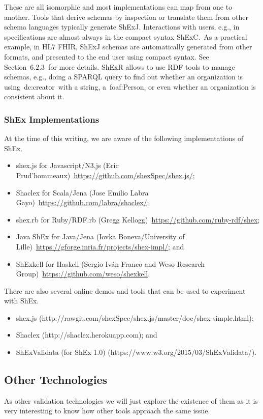 These are all isomorphic and most implementations can map from one to another.
Tools that derive schemas by inspection or translate them from other schema languages typically generate ShExJ. Interactions with users, e.g., in specifications are almost always in the compact syntax ShExC. As a practical example, in HL7 FHIR, ShExJ schemas are automatically generated from other formats, and presented to the end user using compact syntax. See Section 6.2.3 for more details.
ShExR allows to use RDF tools to manage schemas, e.g., doing a SPARQL query to find out whether an organization is using dc:creator with a string, a foaf:Person, or even whether an organization is consistent about it.

\subsubsection{ShEx Implementations} 
At the time of this writing, we are aware of the following implementations of ShEx.

\begin{itemize}
	\item shex.js for Javascript/N3.js (Eric Prud’hommeaux) \url{https://github.com/shexSpec/shex.js/};
	\item Shaclex for Scala/Jena (Jose Emilio Labra Gayo) \url{https://github.com/labra/shaclex/};
	\item shex.rb for Ruby/RDF.rb (Gregg Kellogg) \url{https://github.com/ruby-rdf/shex};
	\item Java ShEx for Java/Jena (Iovka Boneva/University of Lille) \url{https://gforge.inria.fr/projects/shex-impl/}; and
	\item ShExkell for Haskell (Sergio Iván Franco and Weso Research Group) \url{https://github.com/weso/shexkell}.
\end{itemize}

There are also several online demos and tools that can be used to experiment with ShEx.

\begin{itemize}
	\item shex.js (http://rawgit.com/shexSpec/shex.js/master/doc/shex-simple.html);
	\item Shaclex (http://shaclex.herokuapp.com); and
	\item ShExValidata (for ShEx 1.0) (https://www.w3.org/2015/03/ShExValidata/).
\end{itemize}

\subsection{Other Technologies}
As other validation technologies we will just explore the existence of them as it is very interesting to know how other tools approach the same issue.

